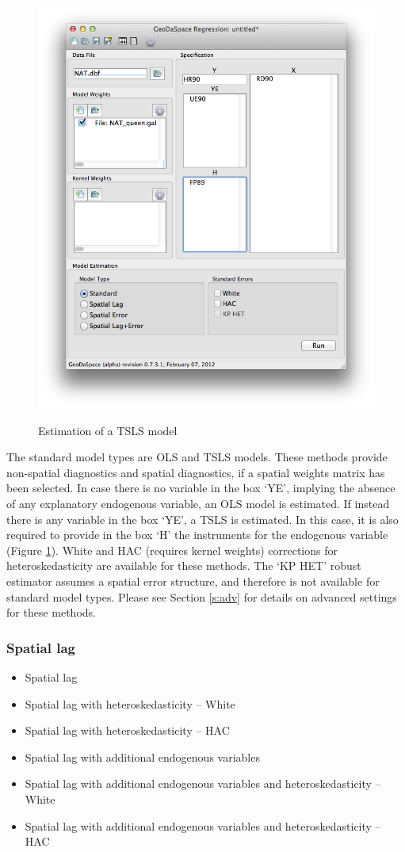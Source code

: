 \documentclass{article}
\begin{document}
\begin{figure}[htb]
\caption{Estimation of a TSLS model}
\label{f:tsls}
\begin{center}
\includegraphics[width=0.7\linewidth]{tsls.png}\\
\end{center}
\end{figure}

The standard model types are OLS and TSLS models. These methods provide non-spatial diagnostics and spatial diagnostics, if a spatial weights matrix has been selected. In case there is no variable in the box `YE', implying the absence of any explanatory endogenous variable, an OLS model is estimated. If instead there is any variable in the box `YE', a TSLS is estimated. In this case, it is also required to provide in the box `H' the instruments for the endogenous variable (Figure \ref{f:tsls}). White and HAC (requires kernel weights) corrections for heteroskedasticity are available for these methods. The `KP HET' robust estimator assumes a spatial error structure, and therefore is not available for standard model types. Please see Section \ref{s:adv} for details on advanced settings for these methods.
\FloatBarrier

\subsubsection*{Spatial lag}
\begin{itemize}
\item Spatial lag
\item Spatial lag with heteroskedasticity -- White
\item Spatial lag with heteroskedasticity -- HAC
\item Spatial lag with additional endogenous variables
\item Spatial lag with additional endogenous variables and heteroskedasticity -- White
\item Spatial lag with additional endogenous variables and heteroskedasticity -- HAC
\end{itemize}
\end{document}
